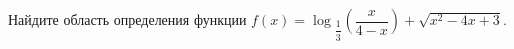 \begin{ex}
	\begin{condition}
		Найдите область определения функции $f(x) = \log$\tiny$_{\dfrac{1}{3}}$\normalsize$\left(\dfrac{x}{4 - x}\right) + \sqrt{x^2 - 4x  + 3}.$
	\end{condition}
	\answer{$ x \in(0;1]\cup[3;4).$}
\end{ex}